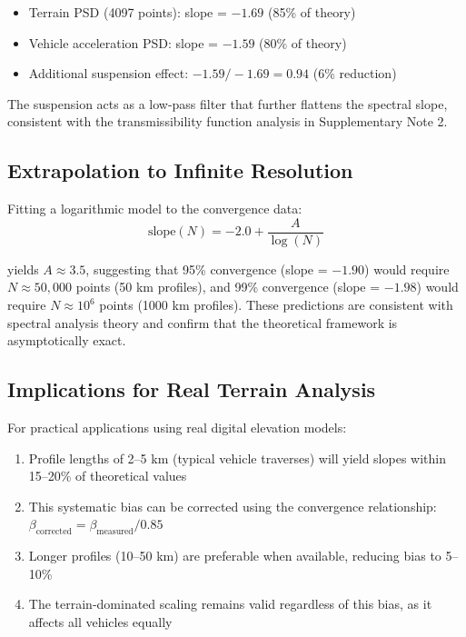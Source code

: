 \documentclass[11pt]{article}
\begin{document}
\begin{itemize}
\item Terrain PSD (4097 points): slope = $-1.69$ (85\% of theory)
\item Vehicle acceleration PSD: slope = $-1.59$ (80\% of theory)
\item Additional suspension effect: $-1.59 / -1.69 = 0.94$ (6\% reduction)
\end{itemize}

The suspension acts as a low-pass filter that further flattens the spectral slope, consistent with the transmissibility function analysis in Supplementary Note 2.

\subsection{Extrapolation to Infinite Resolution}

Fitting a logarithmic model to the convergence data:
\begin{equation}
\text{slope}(N) = -2.0 + \frac{A}{\log(N)}
\end{equation}

yields $A \approx 3.5$, suggesting that 95\% convergence (slope = $-1.90$) would require $N \approx 50{,}000$ points (50 km profiles), and 99\% convergence (slope = $-1.98$) would require $N \approx 10^6$ points (1000 km profiles). These predictions are consistent with spectral analysis theory and confirm that the theoretical framework is asymptotically exact.

\subsection{Implications for Real Terrain Analysis}

For practical applications using real digital elevation models:
\begin{enumerate}
\item Profile lengths of 2--5 km (typical vehicle traverses) will yield slopes within 15--20\% of theoretical values

\item This systematic bias can be corrected using the convergence relationship: $\beta_{\text{corrected}} = \beta_{\text{measured}} / 0.85$

\item Longer profiles (10--50 km) are preferable when available, reducing bias to 5--10\%

\item The terrain-dominated scaling remains valid regardless of this bias, as it affects all vehicles equally
\end{enumerate}
\end{document}
